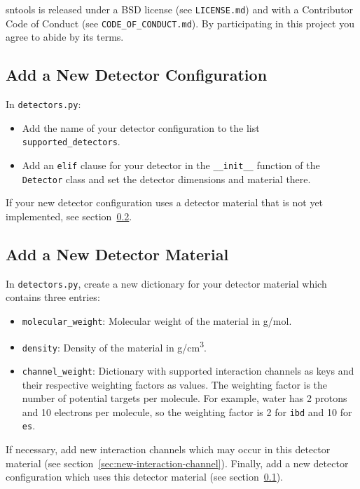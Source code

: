 \documentclass[11pt, oneside]{article}
\begin{document}
sntools is released under a BSD license (see \texttt{LICENSE.md}) and with a Contributor Code of Conduct (see \texttt{CODE\_OF\_CONDUCT.md}).
By participating in this project you agree to abide by its terms.


\subsection{Add a New Detector Configuration}\label{sec:new-detector-config}

In \texttt{detectors.py}:
\begin{itemize}
\item Add the name of your detector configuration to the list \texttt{supported\_detectors}.
\item Add an \texttt{elif} clause for your detector in the \texttt{\_\_init\_\_} function of the \texttt{Detector} class and set the detector dimensions and material there.
\end{itemize}

If your new detector configuration uses a detector material that is not yet implemented, see section~\ref{sec:new-detector-material}.

\subsection{Add a New Detector Material}\label{sec:new-detector-material}

In \texttt{detectors.py}, create a new dictionary for your detector material which contains three entries:
\begin{itemize}
\item \texttt{molecular\_weight}: Molecular weight of the material in \si{g/mol}.
\item \texttt{density}: Density of the material in \si{g/cm^3}.
\item \texttt{channel\_weight}: Dictionary with supported interaction channels as keys and their respective weighting factors as values. The weighting factor is the number of potential targets per molecule. For example, water has 2 protons and 10 electrons per molecule, so the weighting factor is 2 for \texttt{ibd} and 10 for \texttt{es}.
\end{itemize}

If necessary, add new interaction channels which may occur in this detector material (see section~\ref{sec:new-interaction-channel}).
Finally, add a new detector configuration which uses this detector material (see section~\ref{sec:new-detector-config}).
\end{document}
